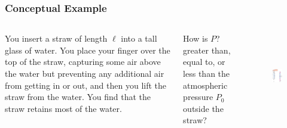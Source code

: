\documentclass[]{beamer}
\begin{document}
        \begin{frame}
          \frametitle{Conceptual Example}
          
              
      
          
          \begin{columns}[c]
            \column{2in}  %
          
      
            You insert
            a straw of length $\ell$ into a tall glass of water. You place your finger over the
            top of the straw, capturing some air above the water but preventing any additional
            air from getting in or out, and then you lift the straw from the water. You
            find that the straw retains most of the water. 
            \vspace{3mm}
      
       
      
            \column{2in}
        How is $P$? greater than, equal to, or less than the atmospheric pressure $P_0$ outside
          the straw?
                
            \begin{figure}[h!]
              \includegraphics[height=1.5in]{images2/conceptual1.jpg}
          \end{figure} 
      
            \end{columns}
          
          
          
          
          
            \end{frame}
      
\setcounter{example}{1}
\end{document}
